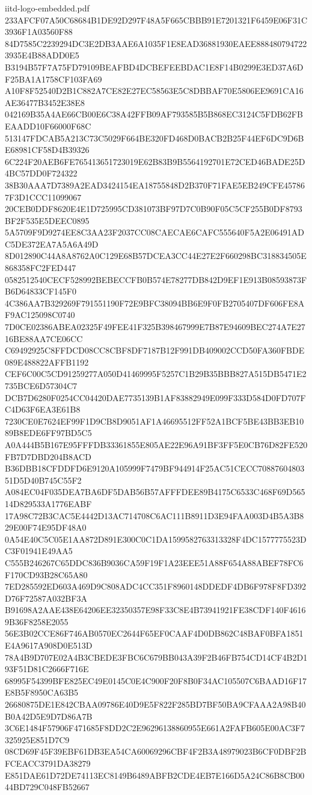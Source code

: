 \begin{filecontents*}[overwrite]{iitd-logo-embedded.pdf}
233AFCF07A50C68684B1DE92D297F48A5F665CBBB91E7201321F6459E06F31C3936F1A03560F88
84D7585C2239294DC3E2DB3AAE6A1035F1E8EAD36881930EAEE8884807947223935E4B88ADD0E5
B3194B57F7A75FD79109BEAFBD4DCBEFEEBDAC1E8F14B0299E3ED37A6DF25BA1A1758CF103FA69
A10F8F52540D2B1C882A7CE82E27EC58563E5C8DBBAF70E5806EE9691CA16AE36477B3452E38E8
042169B35A4AE66CB00E6C38A42FFB09AF793585B5B868EC3124C5FDB62FBEAADD10F66000F68C
513147FDCAB5A213C73C5029F664BE320FD468D0BACB2B25F44EF6DC9D6BE68981CF58D4B39326
6C224F20AEB6FE765413651723019E62B83B9B5564192701E72CED46BADE25D4BC57DD0F724322
38B30AAA7D7389A2EAD3424154EA18755848D2B370F71FAE5EB249CFE457867F3D1CCC11099067
20CEB0DDF8620E4E1D725995CD381073BF97D7C0B90F05C5CF255B0DF8793BF2F535E5DEEC0895
5A5709F9D9274EE8C3AA23F2037CC08CAECAE6CAFC555640F5A2E06491ADC5DE372EA7A5A6A49D
8D012890C44A8A8762A0C129E68B57DCEA3CC44E27E2F660298BC318834505E868358FC2FED447
0582512540CECF528992BEBECCFB0B574E78277DB842D9EF1E913B08593873FB6D64833CF145F0
4C386AA7B329269F791551190F72E9BFC38094BB6E9F0FB2705407DF606FE8AF9AC125098C0740
7D0CE02386ABEA02325F49FEE41F325B398467999E7B87E94609BEC274A7E2716BE88AA7CE06CC
C69492925C8FFDCD08CC8CBF8DF7187B12F991DB409002CCD50FA360FBDE089E488822AFFB1192
CEF6C00C5CD91259277A050D41469995F5257C1B29B35BBB827A515DB5471E2735BCE6D57304C7
DCB7D6280F0254CC04420DAE7735139B1AF83882949E099F333D584D0FD707FC4D63F6EA3E61B8
7230CE0E7624EF99F1D9CB8D9051AF1A46695512FF52A1BCF5BE43BB3EB1089B8EDE6FF97BD5C5
A0A444B5B167E95FFFDB33361855E805AE22E96A91BF3FF5E0CB76D82FE520FB7D7DBD204B8ACD
B36DBB18CFDDFD6E9120A105999F7479BF944914F25AC51CECC7088760480351D5D40B745C55F2
A084EC04F035DEA7BA6DF5DAB56B57AFFFDEE89B4175C6533C468F69D56514D829533A1776EABF
17A98C72B3CAC5E4442D13AC714708C6AC111B8911D3E94FAA003D4B5A3B829E00F74E95DF48A0
0A54E40C5C05E1AA872D891E300C0C1DA1599582763313328F4DC1577775523DC3F01941E49AA5
C555B246267C65DDC836B9036CA59F19F1A23EEE51A88F654A88ABEF78FC6F170CD93B28C65A80
7ED285592ED603A469D9C808ADC4CC351F8960148DDEDF4DB6F978F8FD392D76F72587A032BF3A
B91698A2AAE438E64206EE32350357E98F33C8E4B73941921FE38CDF140F46169B36F8258E2055
56E3B02CCE86F746AB0570EC2644F65EF0CAAF4D0DB862C48BAF0BFA1851E4A9617A908D0E513D
78A4B9D707E02A4B3CBEDE3FBC6C679BB043A39F2B46FB754CD14CF4B2D193F51D81C2666F716E
68995F54399BFE825EC49E0145C0E4C900F20F8B0F34AC105507C6BAAD16F17E8B5F8950CA63B5
26680875DE1E842CBAA09786E40D9E5F822F285BD7BF50BA9CFAAA2A98B40B0A42D5E9D7D86A7B
3C6E1484F57906F471685F8DD2C2E96296138860955E661A2FAFB605E00AC3F7325925E851D7C9
08CD69F45F39EBF61DB3EA54CA60069296CBF4F2B3A48979023B6CF0DBF2BFCEACC3791DA38279
E851DAE61D72DE74113EC8149B6489ABFB2CDE4EB7E166D5A24C86B8CB0044BD729C048FB52667

\end{filecontents*}
